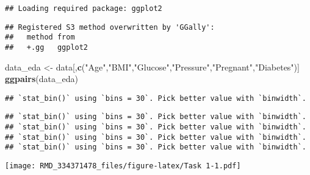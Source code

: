 \documentclass[
]{article}
\newenvironment{Shaded}{\begin{snugshade}}{\end{snugshade}}
\newcommand{\CommentTok}[1]{\textcolor[rgb]{0.56,0.35,0.01}{\textit{#1}}}
\newcommand{\DecValTok}[1]{\textcolor[rgb]{0.00,0.00,0.81}{#1}}
\newcommand{\FunctionTok}[1]{\textcolor[rgb]{0.13,0.29,0.53}{\textbf{#1}}}
\newcommand{\NormalTok}[1]{#1}
\newcommand{\OtherTok}[1]{\textcolor[rgb]{0.56,0.35,0.01}{#1}}
\newcommand{\SpecialCharTok}[1]{\textcolor[rgb]{0.81,0.36,0.00}{\textbf{#1}}}
\newcommand{\StringTok}[1]{\textcolor[rgb]{0.31,0.60,0.02}{#1}}
\begin{document}
\begin{verbatim}
## Loading required package: ggplot2
\end{verbatim}

\begin{verbatim}
## Registered S3 method overwritten by 'GGally':
##   method from   
##   +.gg   ggplot2
\end{verbatim}

\begin{Shaded}
\begin{Highlighting}[]
\NormalTok{data\_eda }\OtherTok{\textless{}{-}}\NormalTok{ data[,}\FunctionTok{c}\NormalTok{(}\StringTok{"Age"}\NormalTok{,}\StringTok{"BMI"}\NormalTok{,}\StringTok{"Glucose"}\NormalTok{,}\StringTok{"Pressure"}\NormalTok{,}\StringTok{"Pregnant"}\NormalTok{,}\StringTok{"Diabetes"}\NormalTok{)]}
\FunctionTok{ggpairs}\NormalTok{(data\_eda)}
\end{Highlighting}
\end{Shaded}

\begin{verbatim}
## `stat_bin()` using `bins = 30`. Pick better value with `binwidth`.
\end{verbatim}

\begin{verbatim}
## `stat_bin()` using `bins = 30`. Pick better value with `binwidth`.
## `stat_bin()` using `bins = 30`. Pick better value with `binwidth`.
## `stat_bin()` using `bins = 30`. Pick better value with `binwidth`.
## `stat_bin()` using `bins = 30`. Pick better value with `binwidth`.
\end{verbatim}

\texttt{[image: RMD\_334371478\_files/figure-latex/Task 1-1.pdf]}

\begin{Shaded}
\end{Shaded}
\end{document}
